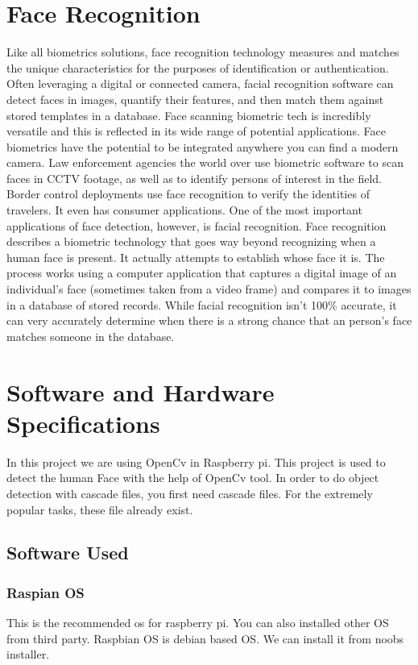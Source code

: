 \documentclass[sigconf]{acmart}
\begin{document}
\section{Face Recognition}
Like all biometrics solutions, face recognition technology measures and matches the unique characteristics for the purposes of identification or authentication. Often leveraging a digital or connected camera, facial recognition software can detect faces in images, quantify their features, and then match them against stored templates in a database.
Face scanning biometric tech is incredibly versatile and this is reflected in its wide range of potential applications.
Face biometrics have the potential to be integrated anywhere you can find a modern camera. Law enforcement agencies the world over use biometric software to scan faces in CCTV footage, as well as to identify persons of interest in the field. Border control deployments use face recognition to verify the identities of travelers. It even has consumer applications.
One of the most important applications of face detection, however, is facial recognition. Face recognition describes a biometric technology that goes way beyond recognizing when a human face is present. It actually attempts to establish whose face it is. The process works using a computer application that captures a digital image of an individual’s face (sometimes taken from a video frame) and compares it to images in a database of stored records. While facial recognition isn’t 100\% accurate, it can very accurately determine when there is a strong chance that an person’s face matches someone in the database.


\section{Software and Hardware Specifications}
In this project we are using OpenCv in Raspberry pi. This project is used to detect the human Face with the help of OpenCv tool. In order to do object detection with cascade files, you first need cascade files. For the extremely popular tasks, these file already exist.

\subsection{Software Used}

\subsubsection{Raspian OS}
This is the recommended os for raspberry pi. You can also installed other OS from third party. Raspbian OS is debian based OS. We can install it from noobs installer. 
\end{document}
